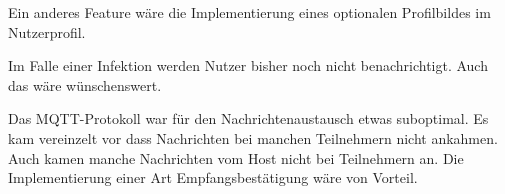 Ein anderes Feature wäre die Implementierung eines optionalen Profilbildes im Nutzerprofil.

Im Falle einer Infektion werden Nutzer bisher noch nicht benachrichtigt. Auch das wäre wünschenswert.

Das MQTT-Protokoll war für den Nachrichtenaustausch etwas suboptimal. Es kam vereinzelt vor dass Nachrichten bei manchen Teilnehmern nicht ankahmen. Auch kamen manche Nachrichten vom Host nicht bei Teilnehmern an. Die Implementierung einer Art Empfangsbestätigung wäre von Vorteil.





